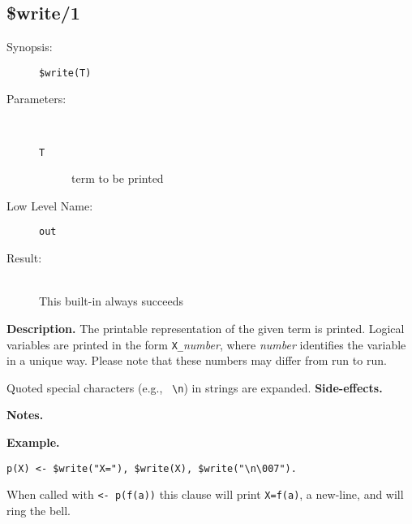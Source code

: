 %
%
%
\subsection{\$write/1}

\begin{description}
\item[Synopsis:]
	{\tt \$write(T)}
\item[Parameters:]\ \\[-0.5cm]
	\begin{description}
	\item[{\tt T}] term to be printed
	\end{description}
\item[Low Level Name:]
	{\tt out}
\item[Result:]\ \\
This built-in always succeeds
\end{description}

\vspace*{0.5cm}
\noindent
{\bf Description.}
The printable representation of the given term is printed.
Logical variables are printed in the form {\tt X\_}{\em number}, where
{\em number\/} identifies the variable in a unique way.
Please note that these numbers may differ from run to run.

Quoted special characters (e.g., {\verb+ \n+}) in strings are expanded.
\vspace*{0.5cm}
\noindent
{\bf Side-effects.}

\vspace*{0.5cm}
\noindent
{\bf Notes.}

\vspace*{0.5cm}
\noindent
{\bf Example.}
\begin{verbatim}
p(X) <- $write("X="), $write(X), $write("\n\007").
\end{verbatim}

When called with {\tt <- p(f(a))} this clause will print
{\tt X=f(a)}, a new-line, and will ring the bell.

